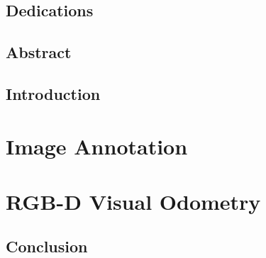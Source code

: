 \frontmatter

\makeflyleaf%

\pagestyle{fancy}
\fancyhf{}
\fancyhead[LE]{\leftmark}
\fancyhead[RO]{\rightmark}
\fancyhead[LO]{\today}
\fancyfoot[CE,CO]{\thepage}

\chapter*{Dedications}%
\label{cha:dedications}


\chapter*{Abstract}%
\label{cha:abstract}


\dominitoc%
\tableofcontents

\mainmatter%

\lstset{style=CodeStyle}

\chapter*{Introduction}%
\label{cha:introduction}


\part{Image Annotation}%
\label{prt:image_annotation}


\part{RGB-D Visual Odometry}%
\label{prt:rgb_d_vo}


\chapter*{Conclusion}%
\label{cha:conclusion}


